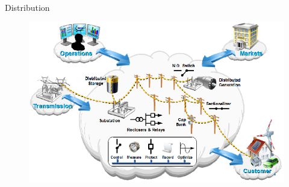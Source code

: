 
\begin{frame}[fragile]{Distribution}
	\begin{figure}[h] 
		\includegraphics[scale=0.45]{imgs/distr.png}
	\end{figure}
\end{frame}






%
%
%

